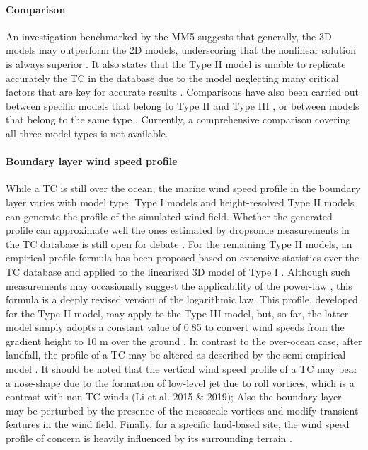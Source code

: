 \paragraph{Comparison} An investigation benchmarked by the MM5 \citep{liu1997multiscale} suggests that generally, the 3D models may outperform the 2D models, underscoring that the nonlinear solution is always superior \citep{kepert2010slab-i,kepert2010slab-ii, kepert2014reply}. It also states that the Type II model is unable to replicate accurately the TC in the database due to the model neglecting many critical factors that are key for accurate results \citep{kepert2010slab-i}. Comparisons have also been carried out between specific models that belong to Type II and Type III \citep{smith2008critique}, or between models that belong to the same type \citep{snaiki2017linear, wills2000review}. Currently, a comprehensive comparison covering all three model types is not available. 

\paragraph{Boundary layer wind speed profile} While a TC is still over the ocean, the marine wind speed profile in the boundary layer varies with model type. Type I models and height-resolved Type II models can generate the profile of the simulated wind field. Whether the generated profile can approximate well the ones estimated by dropsonde measurements in the TC database is still open for debate \citep{kepert2001dynamics-ii, kepert2011choosing, kepert2013how, montgomery2014comments, smith1968surface}. For the remaining Type II models, an empirical profile formula has been proposed based on extensive statistics over the TC database and applied to the linearized 3D model of Type I \citep{vickery2009hurricane-b}. Although such measurements may occasionally suggest the applicability of the power-law \citep{song2016characteristics}, this formula is a deeply revised version of the logarithmic law. This profile, developed for the Type II model, may apply to the Type III model, but, so far, the latter model simply adopts a constant value of 0.85 to convert wind speeds from the gradient height to 10 m over the ground \citep{chavas2015model}. In contrast to the over-ocean case, after landfall, the profile of a TC may be altered as described by the semi-empirical model \citep{snaiki2018semiempirical}. It should be noted that the vertical wind speed profile of a TC may bear a nose-shape due to the formation of low-level jet due to roll vortices, which is a contrast with non-TC winds (Li et al. 2015 & 2019);  Also the boundary layer may be perturbed by the presence of the mesoscale vortices and modify transient features in the wind field. Finally, for a specific land-based site, the wind speed profile of concern is heavily influenced by its surrounding terrain \citep{huang2013prediction}.

